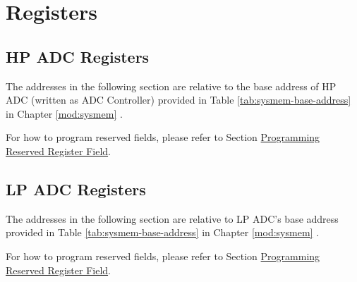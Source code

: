 \documentclass[main\_\_EN.tex]{subfiles}
\begin{document}
\newpage
\section{Registers}
\subsection{HP ADC Registers}

The addresses in the following section are relative to the base address of HP ADC (written as ADC Controller) provided in Table \ref{tab:sysmem-base-address} in Chapter \ref{mod:sysmem} \textit{}.

For how to program reserved fields, please refer to Section \hyperref[programming-reserved-field]{Programming Reserved Register Field}.



\subsection{LP ADC Registers}

The addresses in the following section are relative to LP ADC's base address provided in Table \ref{tab:sysmem-base-address} in Chapter \ref{mod:sysmem} \textit{}.

For how to program reserved fields, please refer to Section \hyperref[programming-reserved-field]{Programming Reserved Register Field}.


\end{document}
